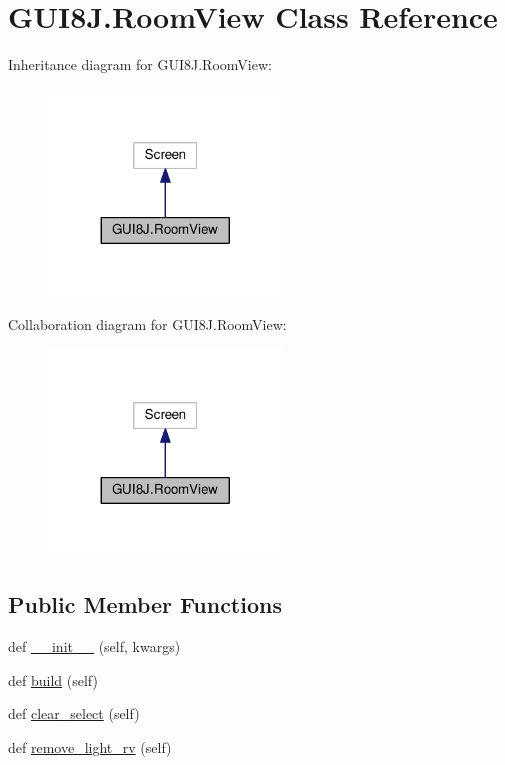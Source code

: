 \hypertarget{classGUI8J_1_1RoomView}{}\section{G\+U\+I8\+J.\+Room\+View Class Reference}
\label{classGUI8J_1_1RoomView}


Inheritance diagram for G\+U\+I8\+J.\+Room\+View\+:
\nopagebreak
\begin{figure}[H]
\begin{center}
\leavevmode
\includegraphics[width=176pt]{classGUI8J_1_1RoomView__inherit__graph}
\end{center}
\end{figure}


Collaboration diagram for G\+U\+I8\+J.\+Room\+View\+:
\nopagebreak
\begin{figure}[H]
\begin{center}
\leavevmode
\includegraphics[width=176pt]{classGUI8J_1_1RoomView__coll__graph}
\end{center}
\end{figure}
\subsection*{Public Member Functions}
\begin{DoxyCompactItemize}
\item 
def \hyperlink{classGUI8J_1_1RoomView_abdd1610222b7965da88ea0fb392a07c2}{\+\_\+\+\_\+init\+\_\+\+\_\+} (self, kwargs)
\item 
def \hyperlink{classGUI8J_1_1RoomView_a3c3f1fc067fd2ebed632e1b67c530962}{build} (self)
\item 
def \hyperlink{classGUI8J_1_1RoomView_a9891bdfcea5d6160d32fdb85aecf4091}{clear\+\_\+select} (self)
\item 
def \hyperlink{classGUI8J_1_1RoomView_a494cf304473168ccc8c02bf21db720e3}{remove\+\_\+light\+\_\+rv} (self)
\end{DoxyCompactItemize}
